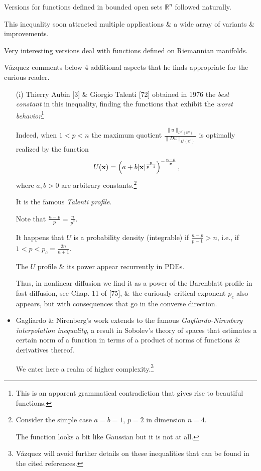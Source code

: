 \documentclass{article}
\begin{document}
Versions for functions defined in bounded open sets $\mathbb{R}^n$ followed naturally.

This inequality soon attracted multiple applications \& a wide array of variants \& improvements.

Very interesting versions deal with functions defined on Riemannian manifolds.

V\'azquez comments below 4 additional aspects that he finds appropriate for the curious reader.
\begin{itemize}
	\item[(i)] Thierry Aubin [3] \& Giorgio Talenti [72] obtained in 1976 the \textit{best constant} in this inequality, finding the functions that exhibit the \textit{worst behavior}\footnote{This is an apparent grammatical contradiction that gives rise to beautiful functions.}
	
	Indeed, when $1 < p < n$ the maximum quotient $\frac{\|u\|_{L^{p^*}(\mathbb{R}^n)}}{\|Du\|_{L^p(\mathbb{R}^n)}}$ is optimally realized by the function
	\begin{align*}
		U({\bf x}) = \left(a + b|{\bf x}|^{\frac{p}{p - 1}}\right)^{-\frac{n - p}{p}},
	\end{align*}
	where $a,b > 0$ are arbitrary constants.\footnote{Consider the simple case $a = b = 1$, $p = 2$ in dimension $n = 4$.
		
		The function looks a bit like Gaussian but it is not at all.}
	
	It is the famous \textit{Talenti profile}.
	
	Note that $\frac{n - p}{p} = \frac{n}{p^*}$.
	
	It happens that $U$ is a probability density (integrable) if $\frac{n - p}{p - 1} > n$, i.e., if $1 < p < p_c = \frac{2n}{n + 1}$.
	
	The $U$ profile \& its power appear recurrently in PDEs.
	
	Thus, in nonlinear diffusion we find it as a power of the Barenblatt profile in fast diffusion, see Chap. 11 of [75], \& the curiously critical exponent $p_c$ also appears, but with consequences that go in the converse direction.
	\item Gagliardo \& Nirenberg's work extends to the famous \textit{Gagliardo-Nirenberg interpolation inequality}, a result in Sobolev's theory of spaces that estimates a certain norm of a function in terms of a product of norms of functions \& derivatives thereof.
	
	We enter here a realm of higher complexity.\footnote{V\'azquez will avoid further details on these inequalities that can be found in the cited references.}
	

\end{itemize}
\end{document}
